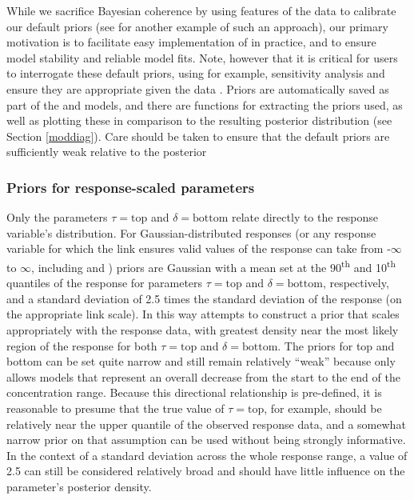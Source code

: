 \documentclass[
  shortnames]{jss}
\begin{document}
While we sacrifice Bayesian coherence by using features of the data to calibrate our default priors (see \citet{chipman2010} for another example of such an approach), our primary motivation is to facilitate easy implementation of  in practice, and to ensure model stability and reliable model fits. Note, however that it is critical for users to interrogate these default priors, using for example, sensitivity analysis \citep{depaoli2020importance} and ensure they are appropriate given the data \citep{gelman2017entropy}. Priors are automatically saved as part of the  and  models, and there are functions for extracting the priors used, as well as plotting these in comparison to the resulting posterior distribution (see Section \ref{moddiag}). Care should be taken to ensure that the default priors are sufficiently weak relative to the posterior

\hypertarget{priors-for-response-scaled-parameters}{%
\subsubsection{Priors for response-scaled parameters}\label{priors-for-response-scaled-parameters}}

Only the parameters \(\tau = \text{top}\) and \(\delta = \text{bottom}\) relate directly to the response variable's distribution. For Gaussian-distributed responses (or any response variable for which the link ensures valid values of the response can take from -\(\infty\) to \(\infty\), including  and ) priors are Gaussian with a mean set at the 90\textsuperscript{th} and 10\textsuperscript{th} quantiles of the response for parameters \(\tau = \text{top}\) and \(\delta = \text{bottom}\), respectively, and a standard deviation of 2.5 times the standard deviation of the response (on the appropriate link scale). In this way  attempts to construct a prior that scales appropriately with the response data, with greatest density near the most likely region of the response for both \(\tau = \text{top}\) and \(\delta = \text{bottom}\). The priors for top and bottom can be set quite narrow and still remain relatively ``weak'' because  only allows models that represent an overall decrease from the start to the end of the concentration range. Because this directional relationship is pre-defined, it is reasonable to presume that the true value of \(\tau = \text{top}\), for example, should be relatively near the upper quantile of the observed response data, and a somewhat narrow prior on that assumption can be used without being strongly informative. In the context of a standard deviation across the whole response range, a value of 2.5 can still be considered relatively broad and should have little influence on the parameter's posterior density.
\end{document}
